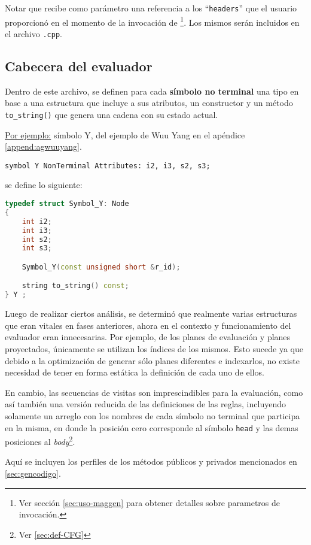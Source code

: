 Notar que recibe como parámetro una referencia a los ``\texttt{headers}'' que el usuario proporcionó en el momento de la invocación de \maggen \footnote{Ver sección \ref{sec:uso-maggen} para obtener detalles sobre parametros de invocación.}. Los mismos serán incluidos en el archivo \texttt{.cpp}.

\subsection{Cabecera del evaluador}

Dentro de este archivo, se definen para cada \textbf{símbolo no terminal} una tipo en base a una estructura que incluye a sus atributos, un constructor y un método \texttt{to\_string()} que genera una cadena con su estado actual.

\underline{Por ejemplo:} símbolo Y, del ejemplo de Wuu Yang en el apéndice \ref{append:agwuuyang}.
\begin{center}\texttt{symbol Y  NonTerminal Attributes: i2, i3, s2, s3;}\end{center}
se define lo siguiente:
\begin{lstlisting}[language=C++, basicstyle=\scriptsize, columns=fullflexible, linewidth=7cm]
typedef struct Symbol_Y: Node
{
    int i2;
    int i3;
    int s2;
    int s3;

    Symbol_Y(const unsigned short &r_id);

    string to_string() const;
} Y ;
\end{lstlisting}

Luego de realizar ciertos análisis, se determinó que realmente varias estructuras que eran vitales en fases anteriores, ahora en el contexto y funcionamiento del evaluador eran innecesarias. Por ejemplo, de los planes de evaluación y planes proyectados, únicamente se utilizan los índices de los mismos. Esto sucede ya que debido a la optimización de generar sólo planes diferentes e indexarlos, no existe necesidad de tener en forma estática la definición de cada uno de ellos.

En cambio, las secuencias de visitas son imprescindibles para la evaluación, como así también una versión reducida de las definiciones de las reglas, incluyendo solamente un arreglo con los nombres de cada símbolo no terminal que participa en la misma, en donde la posición cero corresponde al símbolo \texttt{head} y las demas posiciones al \textit{body}\footnote{Ver \ref{sec:def-CFG}}.

Aquí se incluyen los perfiles de los métodos públicos y privados mencionados en \ref{sec:gencodigo}.

